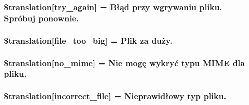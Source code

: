 \subsubsection[{\$translation}]{\setlength{\rightskip}{0pt plus 5cm}\$translation\mbox{[}\textquotesingle{}try\+\_\+again\textquotesingle{}\mbox{]} = \textquotesingle{}Błąd przy wgrywaniu pliku. Spróbuj ponownie.\textquotesingle{}}\label{class_8upload_8pl___p_l_8php_a3afc377bd803683314f413a814243066}
\hypertarget{class_8upload_8pl___p_l_8php_a476278eb4a0c3df56af068e2d511a741}{}
\subsubsection[{\$translation}]{\setlength{\rightskip}{0pt plus 5cm}\$translation\mbox{[}\textquotesingle{}file\+\_\+too\+\_\+big\textquotesingle{}\mbox{]} = \textquotesingle{}Plik za duży.\textquotesingle{}}\label{class_8upload_8pl___p_l_8php_a476278eb4a0c3df56af068e2d511a741}
\hypertarget{class_8upload_8pl___p_l_8php_a191a55df8e3bb7f3c51b70f3c1932e02}{}
\subsubsection[{\$translation}]{\setlength{\rightskip}{0pt plus 5cm}\$translation\mbox{[}\textquotesingle{}no\+\_\+mime\textquotesingle{}\mbox{]} = \textquotesingle{}Nie mogę wykryć typu M\+I\+M\+E dla pliku.\textquotesingle{}}\label{class_8upload_8pl___p_l_8php_a191a55df8e3bb7f3c51b70f3c1932e02}
\hypertarget{class_8upload_8pl___p_l_8php_a4d32343e2699edd6fd435f9c832cb9c7}{}
\subsubsection[{\$translation}]{\setlength{\rightskip}{0pt plus 5cm}\$translation\mbox{[}\textquotesingle{}incorrect\+\_\+file\textquotesingle{}\mbox{]} = \textquotesingle{}Nieprawidłowy typ pliku.\textquotesingle{}}\label{class_8upload_8pl___p_l_8php_a4d32343e2699edd6fd435f9c832cb9c7}
\hypertarget{class_8upload_8pl___p_l_8php_a0dd3e4930ca1f59ae280f4b1006525cd}{}

